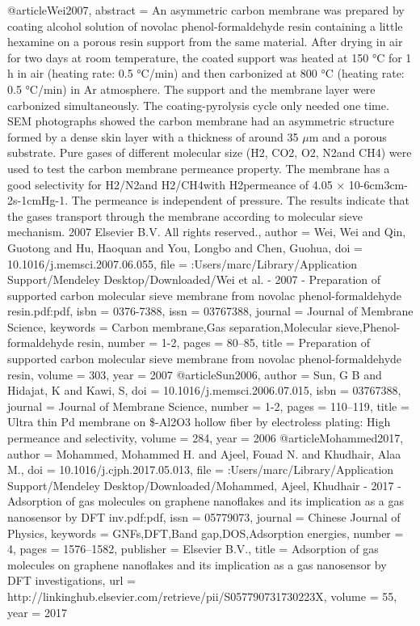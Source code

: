 @article{Wei2007,
abstract = {An asymmetric carbon membrane was prepared by coating alcohol solution of novolac phenol-formaldehyde resin containing a little hexamine on a porous resin support from the same material. After drying in air for two days at room temperature, the coated support was heated at 150 °C for 1 h in air (heating rate: 0.5 °C/min) and then carbonized at 800 °C (heating rate: 0.5 °C/min) in Ar atmosphere. The support and the membrane layer were carbonized simultaneously. The coating-pyrolysis cycle only needed one time. SEM photographs showed the carbon membrane had an asymmetric structure formed by a dense skin layer with a thickness of around 35 $\mu$m and a porous substrate. Pure gases of different molecular size (H2, CO2, O2, N2and CH4) were used to test the carbon membrane permeance property. The membrane has a good selectivity for H2/N2and H2/CH4with H2permeance of 4.05 × 10-6cm3cm-2s-1cmHg-1. The permeance is independent of pressure. The results indicate that the gases transport through the membrane according to molecular sieve mechanism. {\textcopyright} 2007 Elsevier B.V. All rights reserved.},
author = {Wei, Wei and Qin, Guotong and Hu, Haoquan and You, Longbo and Chen, Guohua},
doi = {10.1016/j.memsci.2007.06.055},
file = {:Users/marc/Library/Application Support/Mendeley Desktop/Downloaded/Wei et al. - 2007 - Preparation of supported carbon molecular sieve membrane from novolac phenol-formaldehyde resin.pdf:pdf},
isbn = {0376-7388},
issn = {03767388},
journal = {Journal of Membrane Science},
keywords = {Carbon membrane,Gas separation,Molecular sieve,Phenol-formaldehyde resin},
number = {1-2},
pages = {80--85},
title = {{Preparation of supported carbon molecular sieve membrane from novolac phenol-formaldehyde resin}},
volume = {303},
year = {2007}
}
@article{Sun2006,
author = {Sun, G B and Hidajat, K and Kawi, S},
doi = {10.1016/j.memsci.2006.07.015},
isbn = {03767388},
journal = {Journal of Membrane Science},
number = {1-2},
pages = {110--119},
title = {{Ultra thin Pd membrane on {\$}\alpha{\$}-Al2O3 hollow fiber by electroless plating: High permeance and selectivity}},
volume = {284},
year = {2006}
}
@article{Mohammed2017,
author = {Mohammed, Mohammed H. and Ajeel, Fouad N. and Khudhair, Alaa M.},
doi = {10.1016/j.cjph.2017.05.013},
file = {:Users/marc/Library/Application Support/Mendeley Desktop/Downloaded/Mohammed, Ajeel, Khudhair - 2017 - Adsorption of gas molecules on graphene nanoflakes and its implication as a gas nanosensor by DFT inv.pdf:pdf},
issn = {05779073},
journal = {Chinese Journal of Physics},
keywords = {GNFs,DFT,Band gap,DOS,Adsorption energies},
number = {4},
pages = {1576--1582},
publisher = {Elsevier B.V.},
title = {{Adsorption of gas molecules on graphene nanoflakes and its implication as a gas nanosensor by DFT investigations}},
url = {http://linkinghub.elsevier.com/retrieve/pii/S057790731730223X},
volume = {55},
year = {2017}
}
